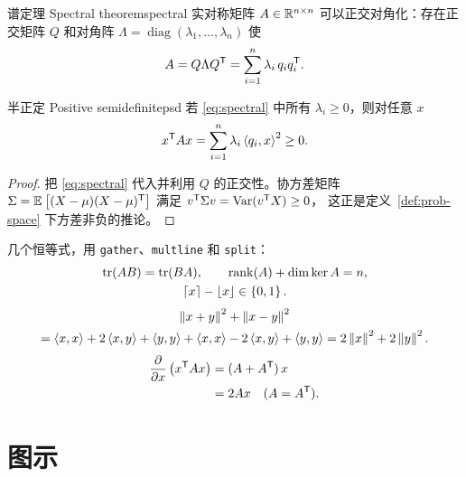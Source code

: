 \begin{theorem}{谱定理 Spectral theorem}{spectral}
  实对称矩阵 $A \in \mathbb{R}^{n\times n}$ 可以正交对角化：存在正交矩阵 $Q$ 和对角阵
  $\Lambda = \operatorname{diag}(\lambda_1, \dots, \lambda_n)$ 使
  \begin{equation}\label{eq:spectral}
    A = Q \Lambda Q^{\mathsf{T}} = \sum_{i=1}^{n} \lambda_i\, q_i q_i^{\mathsf{T}}.
  \end{equation}
\end{theorem}

\begin{proposition}{半正定 Positive semidefinite}{psd}
  若 \eqref{eq:spectral} 中所有 $\lambda_i \ge 0$，则对任意 $x$
  \begin{equation}\label{eq:quad-form}
    x^{\mathsf{T}} A x = \sum_{i=1}^{n} \lambda_i \left\langle q_i, x \right\rangle^2 \ge 0.
  \end{equation}
\end{proposition}

\begin{proof}
  把 \eqref{eq:spectral} 代入并利用 $Q$ 的正交性。协方差矩阵
  $\Sigma = \mathbb{E}_{}\left[ (X - \mu)(X - \mu)^{\mathsf{T}} \right]$ 满足 $v^{\mathsf{T}} \Sigma v = \operatorname{Var}(v^{\mathsf{T}} X) \ge 0$，
  这正是定义~\ref{def:prob-space} 下方差非负的推论。
\end{proof}

几个恒等式，用 \texttt{gather}、\texttt{multline} 和 \texttt{split}：
\begin{gather}
  \operatorname{tr}(AB) = \operatorname{tr}(BA), \qquad \operatorname{rank}(A) + \dim\ker A = n, \label{eq:trace} \\
  \lceil x\rceil - \lfloor x\rfloor \in \left\{ 0, 1 \right\}.
\end{gather}
\begin{multline}\label{eq:long}
  \left\lVert x + y \right\rVert^2 + \left\lVert x - y \right\rVert^2 \\
  = \left\langle x, x \right\rangle + 2\left\langle x, y \right\rangle + \left\langle y, y \right\rangle
  + \left\langle x, x \right\rangle - 2\left\langle x, y \right\rangle + \left\langle y, y \right\rangle
  = 2\left\lVert x \right\rVert^2 + 2\left\lVert y \right\rVert^2.
\end{multline}
\begin{equation}\label{eq:split}
  \begin{split}
    \frac{\partial }{\partial x}\, \bigl(x^{\mathsf{T}} A x\bigr) &= (A + A^{\mathsf{T}})\, x \\
                                    &= 2 A x \quad (A = A^{\mathsf{T}}).
  \end{split}
\end{equation}

\section{图示}\label{sec:figures}

